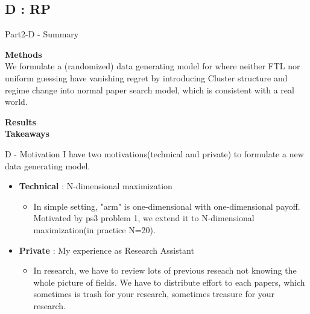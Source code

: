 \documentclass{beamer}
\begin{document}
\subsection{D : RP}

\begin{frame}{Part2-D - Summary}

\textbf{Methods}\\
We formulate a (randomized) data generating model for where neither FTL nor uniform guessing have vanishing regret by introducing Cluster structure and regime change into normal paper search model, which is consistent with a real world.

\vspace{1em}
\textbf{Results}\\



\vspace{1em}
\textbf{Takeaways}\\


\end{frame}

\begin{frame}{D - Motivation}
I have two motivations(technical and private) to formulate a new data generating model.
    \begin{itemize}
        \item \textbf{Technical} : N-dimensional maximization
        \begin{itemize}
            \item In simple setting, "arm" is one-dimensional with one-dimensional payoff. Motivated by ps3 problem 1, we extend it to N-dimensional maximization(in practice N=20).
        \end{itemize}
        \item \textbf{Private} : My experience as Research Assistant
        \begin{itemize}
            \item In research, we have to review lots of previous reseach not knowing the whole picture of fields. We have to distribute effort to each papers, which sometimes is trash for your research, sometimes treasure for your research.
        \end{itemize}
    \end{itemize}
\end{frame}
\end{document}
